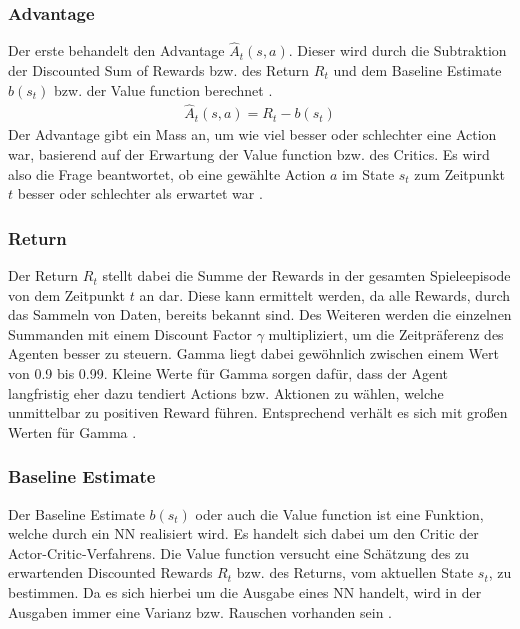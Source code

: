 \subsubsection{Advantage}
Der erste behandelt den Advantage $\hat{A}_{t}(s, a)$. Dieser wird durch die Subtraktion der Discounted Sum of Rewards bzw. des Return $R_{t}$ und dem Baseline Estimate $b(s_{t})$ bzw. der Value function berechnet \cite{DBLP:journals/corr/MnihBMGLHSK16, PPO}. 
\begin{align}
	\hat{A}_{t}(s, a) = R_{t} - b(s_{t})
\end{align}
Der Advantage gibt ein Mass an, um wie viel besser oder schlechter eine Action war, basierend auf der Erwartung der Value function bzw. des Critics. Es wird also die Frage beantwortet, ob eine gewählte Action $a$ im State $s_{t}$ zum Zeitpunkt $t$ besser oder schlechter als erwartet war \cite{DBLP:journals/corr/MnihBMGLHSK16}.

\subsubsection{Return} 
\label{sec:Return}
Der Return $R_{t}$ stellt dabei die Summe der Rewards in der gesamten Spieleepisode von dem Zeitpunkt $t$ an dar. Diese kann ermittelt werden, da alle Rewards, durch das Sammeln von Daten, bereits bekannt sind. Des Weiteren werden die einzelnen Summanden mit einem Discount Factor $\gamma$ multipliziert, um die Zeitpräferenz des Agenten besser zu steuern. Gamma liegt dabei gewöhnlich zwischen einem Wert von 0.9 bis 0.99. Kleine Werte für Gamma sorgen dafür, dass der Agent langfristig eher dazu tendiert Actions bzw. Aktionen zu wählen, welche unmittelbar zu positiven Reward führen. Entsprechend verhält es sich mit großen Werten für Gamma \cite{Sutton1998}.

\subsubsection{Baseline Estimate} 
\label{sec:Baseline_Estimate}
Der Baseline Estimate $b(s_{t})$ oder auch die Value function ist eine Funktion, welche durch ein NN realisiert wird. Es handelt sich dabei um den Critic der Actor-Critic-Verfahrens. Die Value function versucht eine Schätzung des zu erwartenden Discounted Rewards $R_{t}$ bzw. des Returns, vom aktuellen State $s_{t}$, zu bestimmen. Da es sich hierbei um die Ausgabe eines NN handelt, wird in der Ausgaben immer eine Varianz bzw. Rauschen vorhanden sein \cite{DBLP:journals/corr/MnihBMGLHSK16}.

